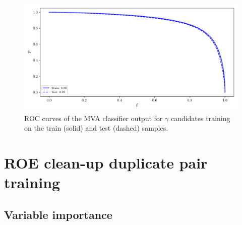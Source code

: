 \documentclass[headings=standardclasses,headings=big,oneside,a4paper,openany,12pt]{scrbook}
\begin{document}
\begin{figure}[H]
\centering
\captionsetup{width=0.8\linewidth}
\includegraphics[width=\linewidth]{fig/addendums/gamma_roc}
\caption{ROC curves of the MVA classifier output for $\gamma$ candidates training on the train (solid) and test (dashed) samples.}
\end{figure}

\section*{ROE clean-up duplicate pair training}

\subsection*{Variable importance}
\end{document}
